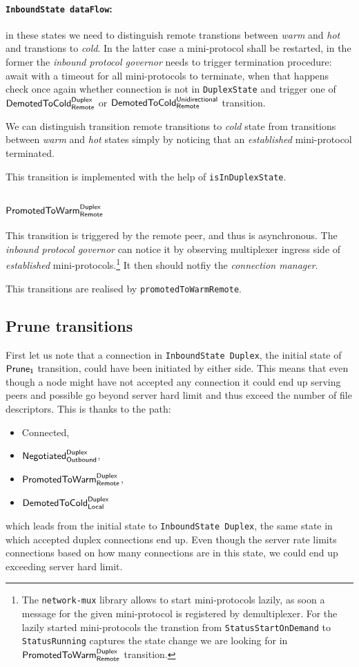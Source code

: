 \documentclass{article}
\def\InitialState{\textbullet}
\def\DuplexState{\texttt{DuplexState}}
\def\InboundStateDup{\texttt{InboundState Duplex}}
\def\InboundStateAny{\texttt{InboundState dataFlow}}
\def\Connected{\textsf{Connected}}
\def\NegotiatedDupOut{$\text{\textsf{Negotiated}}^\text{\textsf{Duplex}}_\text{\textsf{Outbound}}$}
\def\PromotedToWarmDupRem{$\text{\textsf{PromotedToWarm}}^\text{\textsf{Duplex}}_\text{\textsf{Remote}}$}
\def\DemotedToColdDupLoc{$\text{\textsf{DemotedToCold}}^\text{\textsf{Duplex}}_\text{\textsf{Local}}$}
\def\DemotedToColdDupRem{$\text{\textsf{DemotedToCold}}^\text{\textsf{Duplex}}_\text{\textsf{Remote}}$}
\def\DemotedToColdUniRem{$\text{\textsf{DemotedToCold}}^\text{\textsf{Unidirectional}}_\text{\textsf{Remote}}$}
\def\Prune{\textsf{Prune}}
\def\PruneA{$\text{\textsf{Prune}}_\text{\textsf{1}}$}
\def\cold{\textit{cold}}
\def\warm{\textit{warm}}
\def\hot{\textit{hot}}
\def\established{\textit{established}}
\def\inbgov{\textit{inbound protocol governor}}
\begin{document}
\paragraph{\InboundStateAny{}:}
in these states we need to distinguish remote transtions between \warm{} and
\hot{} and transtions to \cold{}.  In the latter case a mini-protocol shall be
restarted, in the former the \inbgov{} needs to trigger termination procedure:
await with a timeout for all mini-protocols to terminate, when that happens
check once again whether connection is not in \DuplexState{} and trigger one of
\DemotedToColdDupRem{} or \DemotedToColdUniRem{} transition.

We can distinguish transition remote transitions to \cold{} state from
transitions between \warm{} and \hot{} states simply by noticing that an
\established{} mini-protocol terminated.

This transition is implemented with the help of \texttt{isInDuplexState}.

\subsection{\PromotedToWarmDupRem{}}
This transition is triggered by the remote peer, and thus is asynchronous.  The
\inbgov{} can notice it by observing multiplexer ingress side of \established{}
mini-protocols.\footnote{The \texttt{network-mux} library allows to start
mini-protocols lazily, as soon a message for the given mini-protocol is
registered by demultiplexer. For the lazily started mini-protocols the
transtion from \texttt{StatusStartOnDemand} to \texttt{StatusRunning} captures
the state change we are looking for in \PromotedToWarmDupRem{} transition.}
It then should notfiy the \textit{connection manager}.

This transitions are realised by \texttt{promotedToWarmRemote}.

\subsection{\Prune{} transitions}
First let us note that a connection in \InboundStateDup{}, the initial
state of \PruneA{} transition, could have been initiated by either side.  This
means that even though a node might have not accepted any connection it could
end up serving peers and possible go beyond server hard limit and thus exceed
the number of file descriptors.  This is thanks to the path:
\begin{itemize}
  \item[] \Connected{},
  \item[] \NegotiatedDupOut{},
  \item[] \PromotedToWarmDupRem{},
  \item[] \DemotedToColdDupLoc{}
\end{itemize}
which leads from the initial state \InitialState{} to \InboundStateDup{}, the
same state in which accepted duplex connections end up.  Even though the server
rate limits connections based on how many connections are in this state, we
could end up exceeding server hard limit.
\end{document}
